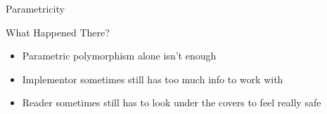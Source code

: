 \begin{section}{Parametricity}
\begin{frame}{What Happened There?}
  \begin{itemize}
    \item Parametric polymorphism alone isn't enough
    \item Implementor sometimes still has too much info to work with
    \item Reader sometimes still has to look under the covers to feel really safe
  \end{itemize}
\end{frame}

\end{section}
